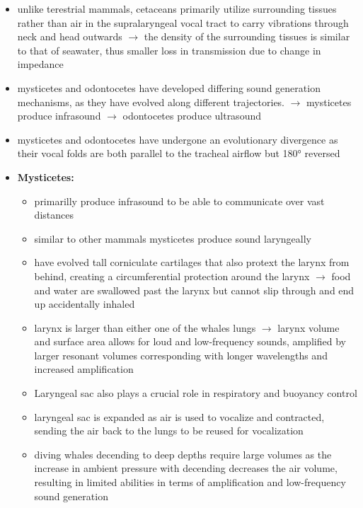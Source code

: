 \documentclass[12pt,a4paper]{article}
\begin{document}
\begin{itemize}
\begin{itemize}
     \item unlike terestrial mammals, cetaceans primarily utilize surrounding tissues rather than air in the supralaryngeal vocal tract to carry vibrations through neck and head outwards
     \newline \indent $\longrightarrow$ the density of the surrounding tissues is similar to that of seawater, thus smaller loss in transmission due to change in impedance
     \item mysticetes and odontocetes have developed differing sound generation mechanisms, as they have evolved along different trajectories.
     \newline \indent $\longrightarrow$ mysticetes produce infrasound
     \newline \indent $\longrightarrow$ odontocetes produce ultrasound
     \item mysticetes and odontocetes have undergone an evolutionary divergence as their vocal folds are both parallel to the tracheal airflow but 180° reversed
     \item \textbf{Mysticetes:}
     \begin{itemize}
       \item primarilly produce infrasound to be able to communicate over vast distances
       \item similar to other mammals mysticetes produce sound laryngeally
       \item have evolved tall corniculate cartilages that also protext the larynx from behind, creating a circumferential protection around the larynx
       \newline \indent $\longrightarrow$ food and water are swallowed past the larynx but cannot slip through and end up accidentally inhaled
       \item larynx is larger than either one of the whales lungs
       \newline \indent $\longrightarrow$ larynx volume and surface area allows for loud and low-frequency sounds, amplified by larger resonant volumes corresponding with longer wavelengths and increased amplification
       \item Laryngeal sac also plays a crucial role in respiratory and buoyancy control
       \item laryngeal sac is expanded as air is used to vocalize and contracted, sending the air back to the lungs to be reused for vocalization
       \item diving whales decending to deep depths require large volumes as the increase in ambient pressure with decending decreases the air volume, resulting in limited abilities in terms of amplification and low-frequency sound generation

\end{itemize}
\end{itemize}
\end{itemize}
\end{document}
